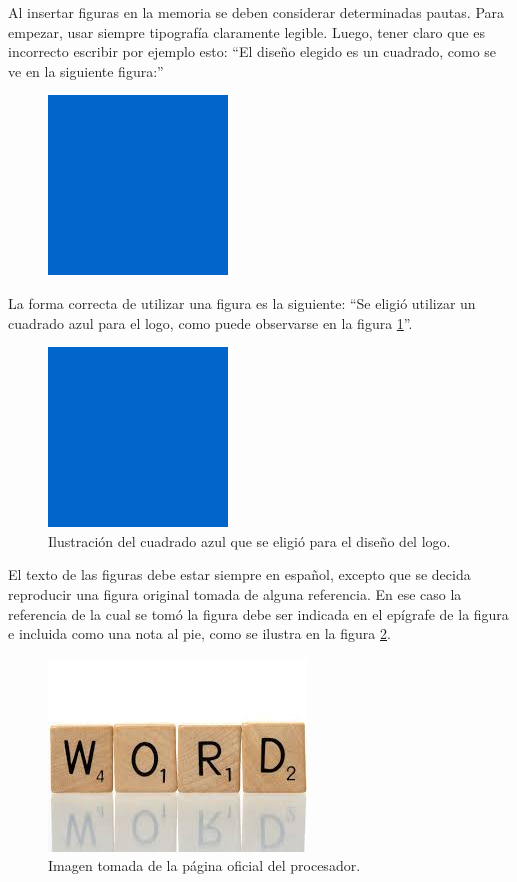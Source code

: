 Al insertar figuras en la memoria se deben considerar determinadas pautas. Para empezar, usar siempre tipografía claramente legible. Luego, tener claro que es incorrecto escribir por ejemplo esto: ``El diseño elegido es un cuadrado, como se ve en la siguiente figura:''

\begin{figure}[h]
\centering
\includegraphics[scale=.3]{./Figures/cuadradoAzul.png}
\end{figure}

La forma correcta de utilizar una figura es la siguiente: ``Se eligió utilizar un cuadrado azul para el logo, como puede observarse en la figura \ref{fig:cuadradoAzul}''.

\begin{figure}[ht]
	\centering
	\includegraphics[scale=.3]{./Figures/cuadradoAzul.png}
	\caption{Ilustración del cuadrado azul que se eligió para el diseño del logo.}
	\label{fig:cuadradoAzul}
\end{figure}

El texto de las figuras debe estar siempre en español, excepto que se decida reproducir una figura original tomada de alguna referencia. En ese caso la referencia de la cual se tomó la figura debe ser indicada en el epígrafe de la figura e incluida como una nota al pie, como se ilustra en la figura \ref{fig:palabraIngles}.

\begin{figure}[htpb]
	\centering
	\includegraphics[scale=.25]{./Figures/word.jpeg}
	\caption{Imagen tomada de la página oficial del procesador\protect\footnotemark.}
	\label{fig:palabraIngles}
\end{figure}

